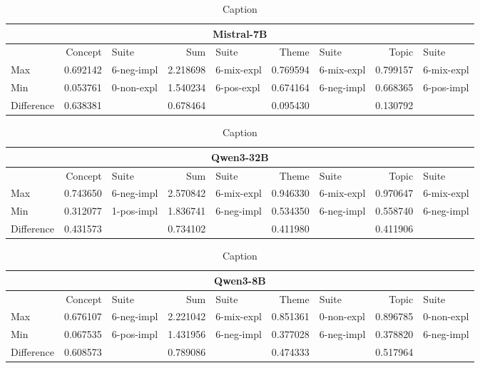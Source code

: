 \begin{table}[]
    \begin{tabular}{l|rlrlrlrl}
    \toprule
    \multicolumn{9}{c}{\textbf{Mistral-7B}} \\
    \midrule
     & Concept & Suite & Sum & Suite & Theme & Suite & Topic & Suite \\
    \midrule
    Max & 0.692142 & 6-neg-impl & 2.218698 & 6-mix-expl & 0.769594 & 6-mix-expl & 0.799157 & 6-mix-expl \\
    Min & 0.053761 & 0-non-expl & 1.540234 & 6-pos-expl & 0.674164 & 6-neg-impl & 0.668365 & 6-pos-impl \\
    \midrule
    Difference & 0.638381 &  & 0.678464 &  & 0.095430 &  & 0.130792 &  \\
    \bottomrule
    \end{tabular}
    
    \begin{tabular}{l|rlrlrlrl}
    \toprule
    \multicolumn{9}{c}{\textbf{Qwen3-32B}} \\
    \midrule
     & Concept & Suite & Sum & Suite & Theme & Suite & Topic & Suite \\
    \midrule
    Max & 0.743650 & 6-neg-impl & 2.570842 & 6-mix-expl & 0.946330 & 6-mix-expl & 0.970647 & 6-mix-expl \\
    Min & 0.312077 & 1-pos-impl & 1.836741 & 6-neg-impl & 0.534350 & 6-neg-impl & 0.558740 & 6-neg-impl \\
    \midrule
    Difference & 0.431573 &  & 0.734102 &  & 0.411980 &  & 0.411906 &  \\
    \bottomrule
    \end{tabular}
    
    \begin{tabular}{l|rlrlrlrl}
    \toprule
    \multicolumn{9}{c}{\textbf{Qwen3-8B}} \\
    \midrule
     & Concept & Suite & Sum & Suite & Theme & Suite & Topic & Suite \\
    \midrule
    Max & 0.676107 & 6-neg-impl & 2.221042 & 6-mix-expl & 0.851361 & 0-non-expl & 0.896785 & 0-non-expl \\
    Min & 0.067535 & 6-pos-impl & 1.431956 & 6-neg-impl & 0.377028 & 6-neg-impl & 0.378820 & 6-neg-impl \\
    \midrule
    Difference & 0.608573 &  & 0.789086 &  & 0.474333 &  & 0.517964 &  \\
    \bottomrule
    \end{tabular}
    \caption{Caption}
    \label{tab:placeholder}
\end{table}